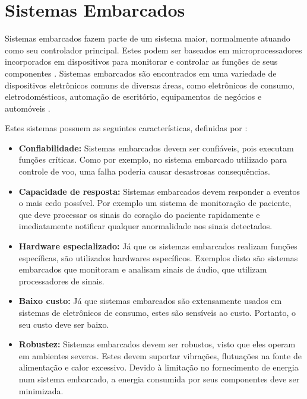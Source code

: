 \section{Sistemas Embarcados}


Sistemas embarcados fazem parte de um sistema maior, normalmente atuando como seu controlador principal. Estes podem ser baseados em microprocessadores incorporados em dispositivos para monitorar e controlar as funções de seus componentes \cite{reddy:2002}. Sistemas embarcados são encontrados em uma variedade de dispositivos eletrônicos comuns de diversas áreas, como eletrônicos de consumo, eletrodomésticos, automação de escritório, equipamentos de negócios e automóveis \cite{vahid:2001}.

Estes sistemas possuem as seguintes características, definidas por :

\begin{itemize}
    \item \textbf{Confiabilidade:} Sistemas embarcados devem ser confiáveis, pois executam funções críticas. Como por exemplo, no sistema embarcado utilizado para controle de voo, uma falha poderia causar desastrosas consequências.
    
    \item \textbf{Capacidade de resposta:} Sistemas embarcados devem responder a eventos o mais cedo possível. Por exemplo um sistema de monitoração de paciente, que deve processar os sinais do coração do paciente rapidamente e imediatamente notificar qualquer anormalidade nos sinais detectados.
    
    \item \textbf{Hardware especializado:} Já que os sistemas embarcados realizam funções específicas, são utilizados hardwares específicos. Exemplos disto são sistemas embarcados que monitoram e analisam sinais de áudio, que utilizam processadores de sinais.
    
    \item \textbf{Baixo custo:} Já que sistemas embarcados são extensamente usados em sistemas de eletrônicos de consumo, estes são sensíveis ao custo. Portanto, o seu custo deve ser baixo.
    
    \item \textbf{Robustez:} Sistemas embarcados devem ser robustos, visto que eles operam em ambientes severos. Estes devem suportar vibrações, flutuações na fonte de alimentação e calor excessivo. Devido à limitação no fornecimento de energia num sistema embarcado, a energia consumida por seus componentes deve ser minimizada.
\end{itemize}